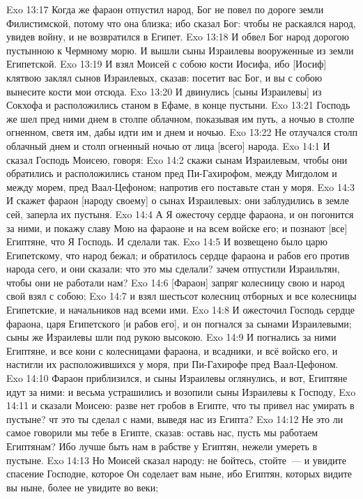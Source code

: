 \rsbpar\vs Exo 13:17 Когда же фараон отпустил народ, Бог не повел  по дороге земли Филистимской, потому что она близка; ибо сказал Бог: чтобы не раскаялся народ, увидев войну, и не возвратился в Египет.
\vs Exo 13:18 И обвел Бог народ дорогою пустынною к Чермному морю. И вышли сыны Израилевы вооруженные из земли Египетской.
\vs Exo 13:19 И взял Моисей с собою кости Иосифа, ибо [Иосиф] клятвою заклял сынов Израилевых, сказав: посетит вас Бог, и вы с собою вынесите кости мои отсюда.
\vs Exo 13:20 И двинулись [сыны Израилевы] из Сокхофа и расположились станом в Ефаме, в конце пустыни.
\vs Exo 13:21 Господь же шел пред ними днем в столпе облачном, показывая им путь, а ночью в столпе огненном, светя им, дабы идти им и днем и ночью.
\vs Exo 13:22 Не отлучался столп облачный днем и столп огненный ночью от лица [всего] народа.
\vs Exo 14:1 И сказал Господь Моисею, говоря:
\vs Exo 14:2 скажи сынам Израилевым, чтобы они обратились и расположились станом пред Пи-Гахирофом, между Мигдолом и между морем, пред Ваал-Цефоном; напротив его поставьте стан у моря.
\vs Exo 14:3 И скажет фараон [народу своему] о сынах Израилевых: они заблудились в земле сей, заперла их пустыня.
\vs Exo 14:4 А Я ожесточу сердце фараона, и он погонится за ними, и покажу славу Мою на фараоне и на всем войске его; и познают [все] Египтяне, что Я Господь. И сделали так.
\rsbpar\vs Exo 14:5 И возвещено было царю Египетскому, что народ бежал; и обратилось сердце фараона и рабов его против народа сего, и они сказали: что это мы сделали? зачем отпустили Израильтян, чтобы они не работали нам?
\vs Exo 14:6 [Фараон] запряг колесницу свою и народ свой взял с собою;
\vs Exo 14:7 и взял шестьсот колесниц отборных и все колесницы Египетские, и начальников над всеми ими.
\vs Exo 14:8 И ожесточил Господь сердце фараона, царя Египетского [и рабов его], и он погнался за сынами Израилевыми; сыны же Израилевы шли под рукою высокою.
\vs Exo 14:9 И погнались за ними Египтяне, и все кони с колесницами фараона, и всадники, и всё войско его, и настигли их расположившихся у моря, при Пи-Гахирофе пред Ваал-Цефоном.
\vs Exo 14:10 Фараон приблизился, и сыны Израилевы оглянулись, и вот, Египтяне идут за ними: и весьма устрашились и возопили сыны Израилевы к Господу,
\vs Exo 14:11 и сказали Моисею: разве нет гробов в Египте, что ты привел нас умирать в пустыне? чт это ты сделал с нами, выведя нас из Египта?
\vs Exo 14:12 Не это ли самое говорили мы тебе в Египте, сказав: оставь нас, пусть мы работаем Египтянам? Ибо лучше быть нам в рабстве у Египтян, нежели умереть в пустыне.
\vs Exo 14:13 Но Моисей сказал народу: не бойтесь, стойте~--- и увидите спасение Господне, которое Он соделает вам ныне, ибо Египтян, которых видите вы ныне, более не увидите во веки;

